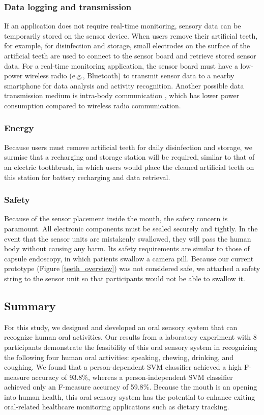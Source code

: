 \subsubsection{Data logging and transmission}
If an application does not require real-time monitoring, sensory data can be temporarily stored on the sensor device. When users remove their artificial teeth, for example, for disinfection and storage, small electrodes on the surface of the artificial teeth are used to connect to the sensor board and retrieve stored sensor data. For a real-time monitoring application, the sensor board must have a low-power wireless radio (e.g., Bluetooth) to transmit sensor data to a nearby smartphone for data analysis and activity recognition. Another possible data transmission medium is intra-body communication \cite{Hachisuka:2003}, which has lower power consumption compared to wireless radio communication.

\subsubsection{Energy}
Because users must remove artificial teeth for daily disinfection and storage, we surmise that a recharging and storage station will be required, similar to that of an electric toothbrush, in which users would place the cleaned artificial teeth on this station for battery recharging and data retrieval. 

\subsubsection{Safety}
Because of the sensor placement inside the mouth, the safety concern is paramount. All electronic components must be sealed securely and tightly. In the event that the sensor units are mistakenly swallowed, they will pass the human body without causing any harm. Its safety requirements are similar to those of capsule endoscopy, in which patients swallow a camera pill. Because our current prototype (Figure \ref{teeth_overview}) was not considered safe, we attached a safety string to the sensor unit so that participants would not be able to swallow it.

\subsection{Summary}
For this study, we designed and developed an oral sensory system that can recognize human oral activities. Our results from a laboratory experiment with 8 participants demonstrate the feasibility of this oral sensory system in recognizing the following four human oral activities: speaking, chewing, drinking, and coughing. We found that a person-dependent SVM classifier achieved a high F-measure accuracy of 93.8$\%$, whereas a person-independent SVM classifier achieved only an F-measure accuracy of 59.8$\%$. 
Because the mouth is an opening into human health, this oral sensory system has the potential to enhance exiting oral-related healthcare monitoring applications such as dietary tracking. 

\let\cleardoublepage\clearpage
